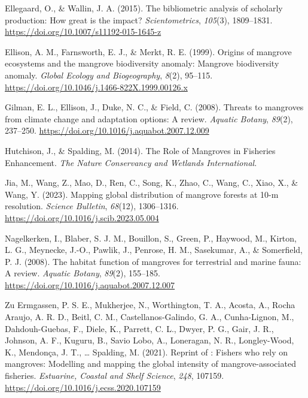 \documentclass[
  12pt,
]{article}
\newlength{\cslhangindent}
\newlength{\cslentryspacingunit} %
\newenvironment{CSLReferences}[2] %
 {%
  \setlength{\parindent}{0pt}
  \ifodd #1
  \let\oldpar\par
  \def\par{\hangindent=\cslhangindent\oldpar}
  \fi
  \setlength{\parskip}{#2\cslentryspacingunit}
 }%
 {}
\begin{document}
\begin{CSLReferences}{1}{2}
\leavevmode{}%
Ellegaard, O., \& Wallin, J. A. (2015). The bibliometric analysis of scholarly production: {How} great is the impact? \emph{Scientometrics}, \emph{105}(3), 1809--1831. \url{https://doi.org/10.1007/s11192-015-1645-z}

\leavevmode{}%
Ellison, A. M., Farnsworth, E. J., \& Merkt, R. E. (1999). Origins of mangrove ecosystems and the mangrove biodiversity anomaly: {Mangrove} biodiversity anomaly. \emph{Global Ecology and Biogeography}, \emph{8}(2), 95--115. \url{https://doi.org/10.1046/j.1466-822X.1999.00126.x}

\leavevmode{}%
Gilman, E. L., Ellison, J., Duke, N. C., \& Field, C. (2008). Threats to mangroves from climate change and adaptation options: {A} review. \emph{Aquatic Botany}, \emph{89}(2), 237--250. \url{https://doi.org/10.1016/j.aquabot.2007.12.009}

\leavevmode{}%
Hutchison, J., \& Spalding, M. (2014). The {Role} of {Mangroves} in {Fisheries Enhancement}. \emph{The Nature Conservancy and Wetlands International.}

\leavevmode{}%
Jia, M., Wang, Z., Mao, D., Ren, C., Song, K., Zhao, C., Wang, C., Xiao, X., \& Wang, Y. (2023). Mapping global distribution of mangrove forests at 10-m resolution. \emph{Science Bulletin}, \emph{68}(12), 1306--1316. \url{https://doi.org/10.1016/j.scib.2023.05.004}

\leavevmode{}%
Nagelkerken, I., Blaber, S. J. M., Bouillon, S., Green, P., Haywood, M., Kirton, L. G., Meynecke, J.-O., Pawlik, J., Penrose, H. M., Sasekumar, A., \& Somerfield, P. J. (2008). The habitat function of mangroves for terrestrial and marine fauna: {A} review. \emph{Aquatic Botany}, \emph{89}(2), 155--185. \url{https://doi.org/10.1016/j.aquabot.2007.12.007}

\leavevmode{}%
Zu Ermgassen, P. S. E., Mukherjee, N., Worthington, T. A., Acosta, A., Rocha Araujo, A. R. D., Beitl, C. M., Castellanos-Galindo, G. A., Cunha-Lignon, M., Dahdouh-Guebas, F., Diele, K., Parrett, C. L., Dwyer, P. G., Gair, J. R., Johnson, A. F., Kuguru, B., Savio Lobo, A., Loneragan, N. R., Longley-Wood, K., Mendonça, J. T., \ldots{} Spalding, M. (2021). Reprint of : {Fishers} who rely on mangroves: {Modelling} and mapping the global intensity of mangrove-associated fisheries. \emph{Estuarine, Coastal and Shelf Science}, \emph{248}, 107159. \url{https://doi.org/10.1016/j.ecss.2020.107159}

\end{CSLReferences}
\end{document}
